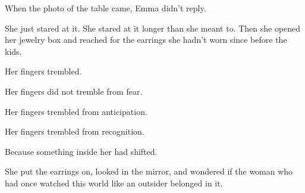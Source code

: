 When the photo of the table came, Emma didn’t reply.

She just stared at it. She stared at it longer than she meant to.
Then she opened her jewelry box and reached for the earrings she hadn’t worn since before the kids.

Her fingers trembled.

Her fingers did not tremble from fear.  

Her fingers trembled from anticipation.

Her fingers trembled from recognition.

Because something inside her had shifted.

She put the earrings on, looked in the mirror, and wondered if the woman who had once watched this world 
like an outsider belonged in it.

\medskip

